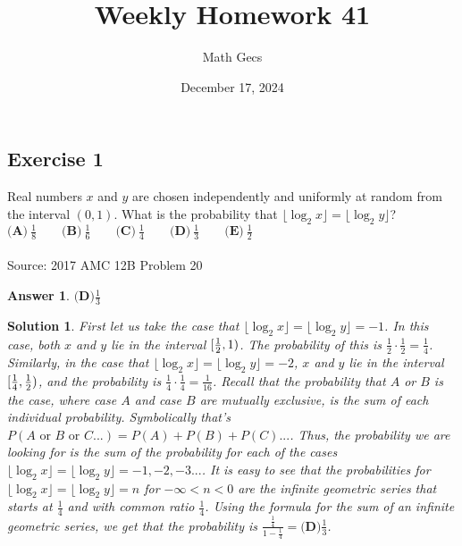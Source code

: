 \documentclass[12pt]{article}
\title{Weekly Homework 41}
\author{Math Gecs}
\date{December 17, 2024}
\newtheorem*{answer*}{Answer}
\newtheorem*{solution*}{Solution}
\begin{document}
\maketitle

\subsection*{Exercise 1}
Real numbers $x$ and $y$ are chosen independently and uniformly at random from the interval $(0,1)$. What is the probability that $\lfloor\log_2x\rfloor=\lfloor\log_2y\rfloor$?
\\
$\textbf{(A)}\ \frac{1}{8}\qquad\textbf{(B)}\ \frac{1}{6}\qquad\textbf{(C)}\ \frac{1}{4}\qquad\textbf{(D)}\ \frac{1}{3}\qquad\textbf{(E)}\ \frac{1}{2}$\\ \\
Source: 2017 AMC 12B Problem 20\\

\begin{answer*}
$\boxed{\textbf{(D)}\frac{1}{3}}$
\end{answer*}

\begin{solution*}
First let us take the case that $\lfloor \log_2{x} \rfloor = \lfloor \log_2{y} \rfloor = -1$. In this case, both $x$ and $y$ lie in the interval $[{1\over2}, 1)$. The probability of this is $\frac{1}{2} \cdot \frac{1}{2} = \frac{1}{4}$. Similarly, in the case that $\lfloor \log_2{x} \rfloor = \lfloor \log_2{y} \rfloor = -2$, $x$ and $y$ lie in the interval $[{1\over4}, {1\over2})$, and the probability is $\frac{1}{4} \cdot \frac{1}{4} = \frac{1}{16}$. Recall that the probability that $A$ or $B$ is the case, where case $A$ and case $B$ are mutually exclusive, is the sum of each individual probability. Symbolically that's $P(A \text{ or } B \text{ or } C...) = P(A) + P(B) + P(C)...$. Thus, the probability we are looking for is the sum of the probability for each of the cases $\lfloor \log_2{x} \rfloor = \lfloor \log_2{y} \rfloor = -1, -2, -3...$. It is easy to see that the probabilities for $\lfloor \log_2{x} \rfloor = \lfloor \log_2{y} \rfloor = n$ for $-\infty < n < 0$ are the infinite geometric series that starts at $\frac{1}{4}$ and with common ratio $\frac{1}{4}$. Using the formula for the sum of an infinite geometric series, we get that the probability is $\frac{\frac{1}{4}}{1 - \frac{1}{4}} = \boxed{\textbf{(D)}\frac{1}{3}}$.
\end{solution*}
\end{document}
